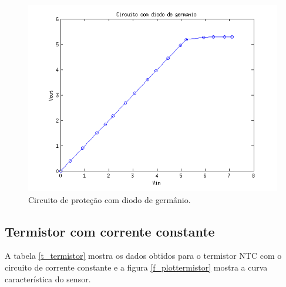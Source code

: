 \begin{figure}[H]
	\centering
	\includegraphics[scale=1]{img/plotgermanio.png}
	\caption{Circuito de proteção com diodo de germânio.}
	\label{f_plotgermanio}
\end{figure}

\subsection{Termistor com corrente constante}
A tabela \ref{t_termistor} mostra os dados obtidos para o termistor NTC com o circuito de corrente constante e a figura \ref{f_plottermistor} mostra a curva característica do sensor.

